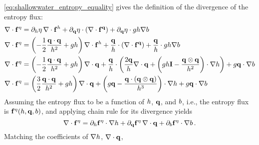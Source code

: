 \eqref{eq:shallowwater_entropy_equality} gives the definition of the
divergence of the entropy flux:
\begin{align}
  \nabla\cdot\mathbf{f}^\eta
  &= 
    \partial_h\eta\,\nabla\cdot
    \mathbf{f}^h
  + \partial_{\mathbf{q}}\eta\cdot
    \left(\nabla\cdot\mathbf{f}^{\mathbf{q}}\right)
  + \partial_{\mathbf{q}}\eta\cdot gh\nabla b
  \nonumber\\
  \nabla\cdot\mathbf{f}^\eta
  &= 
    \left(-\frac{1}{2}\frac{\mathbf{q}\cdot\mathbf{q}}{h^2}
    + gh\right)
    \nabla\cdot\mathbf{f}^h
    + \frac{\mathbf{q}}{h}\cdot
    \left(\nabla\cdot\mathbf{f}^{\mathbf{q}}\right)
    + \frac{\mathbf{q}}{h}\cdot gh\nabla b
  \nonumber\\
  \nabla\cdot\mathbf{f}^\eta
  &= 
    \left(-\frac{1}{2}\frac{\mathbf{q}\cdot\mathbf{q}}{h^2}
    + gh\right)
    \nabla\cdot\mathbf{q}
    + \frac{\mathbf{q}}{h}\cdot
    \left(\frac{2\mathbf{q}}{h}\nabla\cdot\mathbf{q}
    + \left(gh\mathbf{I}
    - \frac{\mathbf{q}\otimes\mathbf{q}}{h^2}\right)\cdot\nabla h\right)
    + g\mathbf{q}\cdot\nabla b
  \nonumber\\\label{eq:shallowwater_divergence_coef}
  \nabla\cdot\mathbf{f}^\eta
  &= 
    \left(\frac{3}{2}\frac{\mathbf{q}\cdot\mathbf{q}}{h^2}
    + gh\right)
    \nabla\cdot\mathbf{q}
    + \left(g\mathbf{q}
    - \frac{\mathbf{q}\cdot(\mathbf{q}\otimes\mathbf{q})}
    {h^3}\right)\cdot\nabla h
    + g\mathbf{q}\cdot\nabla b
\end{align}
Assuming the entropy flux to be a function of $h$, $\mathbf{q}$,
and $b$, i.e., the entropy flux is
$\mathbf{f}^\eta(h,\mathbf{q},b)$,
and applying chain rule for its divergence yields
\begin{equation}
  \nabla\cdot\mathbf{f}^\eta
  = \partial_h\mathbf{f}^\eta\cdot\nabla h
  + \partial_{\mathbf{q}}\mathbf{f}^\eta
  \,\nabla\cdot\mathbf{q}
  + \partial_b\mathbf{f}^\eta\cdot\nabla b
  \,.
\end{equation}
Matching the coefficients of $\nabla h$, $\nabla\cdot\mathbf{q}$,

